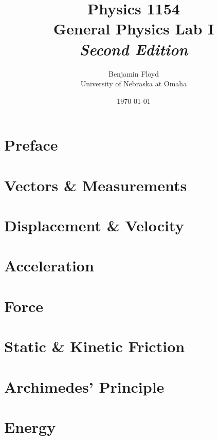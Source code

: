\documentclass{book}
\title{Physics 1154\\
General Physics Lab I\\
{\Large\emph{Second Edition}}}
\author{Benjamin Floyd\\
University of Nebraska at Omaha}
\date{\today}
\theoremstyle{definition}
\begin{document}
\frontmatter

\maketitle

\tableofcontents

\chapter{Preface}


\mainmatter

\chapter{Vectors \& Measurements} \label{chap:Vectors-Measurements}


\chapter{Displacement \& Velocity} \label{chap:Disp-Vel}
\setcounter{question}{0}


\chapter{Acceleration} \label{chap:Acceleration}
\setcounter{question}{0}


\chapter{Force} \label{chap:Force}
\setcounter{question}{0}


\chapter{Static \& Kinetic Friction} \label{chap:Friction}
\setcounter{question}{0}


\chapter{Archimedes' Principle} \label{chap:Archimedes}
\setcounter{question}{0}


\chapter{Energy} \label{chap:Energy}
\setcounter{question}{0}

\end{document}
